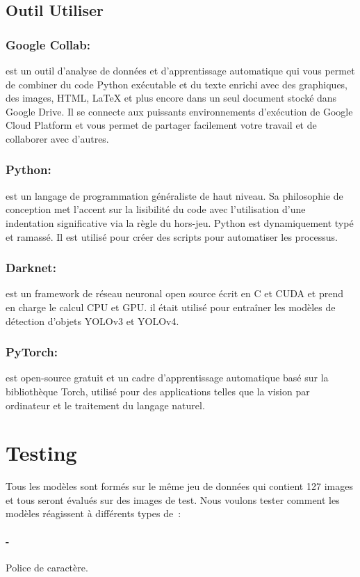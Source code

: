      \subsection{Outil Utiliser}
               \subsubsection{Google Collab:} est un outil d'analyse de données et d'apprentissage automatique qui vous permet de combiner du code Python exécutable et du texte enrichi avec des 	graphiques, des images, HTML, LaTeX et plus encore dans un seul document stocké dans Google Drive. Il se connecte aux puissants environnements d'exécution de Google Cloud Platform et vous permet de partager facilement votre travail et de collaborer avec d'autres.
               \subsubsection{Python:} est un langage de programmation généraliste de haut niveau. Sa philosophie de conception met l'accent sur la lisibilité du code avec l'utilisation d'une indentation significative via la règle du hors-jeu. Python est dynamiquement typé et ramassé. Il est utilisé pour créer des scripts pour automatiser les processus. 
               \subsubsection{Darknet:} est un framework de réseau neuronal open source écrit en C et CUDA et prend en charge le calcul CPU et GPU. il était utilisé pour entraîner les modèles de détection d'objets YOLOv3 et YOLOv4.
               \subsubsection{PyTorch:} est open-source gratuit et un cadre d'apprentissage automatique basé sur la bibliothèque Torch, utilisé pour des applications telles que la vision par ordinateur et le traitement du langage naturel.


\section{Testing}
     Tous les modèles sont formés sur le même jeu de données qui contient 127 images et tous seront évalués sur des images de test.
     Nous voulons tester comment les modèles réagissent à différents types de :
     \paragraph{-} Police de caractère.
